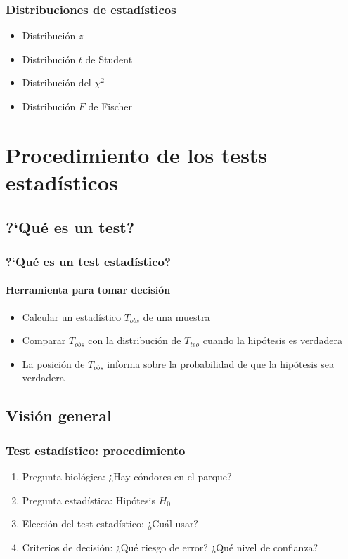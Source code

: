 \documentclass[mathserif]{beamer}
\begin{document}
\begin{frame}[label=otherdist2]
   \frametitle{Distribuciones de estad\'isticos}
   \begin{itemize}
      \item Distribuci\'on $z$ 
      \item Distribuci\'on $t$ de Student
      \item Distribuci\'on del $\chi^2$ 
      \item Distribuci\'on $F$ de Fischer
   \end{itemize}
\end{frame}%




\section[Procedimiento]{Procedimiento de los tests estad\'isticos}

\subsection[?`Qu\'e es un test?]{?`Qu\'e es un test?}

\begin{frame}[label=testdef]
   \frametitle{?`Qu\'e es un test estad\'istico?}
   \framesubtitle{Herramienta para tomar decisi\'on}
   \begin{itemize}
      \item Calcular un estad\'istico $T_{obs}$ de una muestra
      \item Comparar $T_{obs}$ con la distribuci\'on de $T_{teo}$ cuando la hip\'otesis es verdadera
      \item La posici\'on de $T_{obs}$ informa sobre la probabilidad de que la hip\'otesis sea verdadera
   \end{itemize}
\end{frame}%


\subsection[Generalidades]{Visi\'on general}

\begin{frame}[label=testproc1]
   \frametitle{Test estad\'istico: procedimiento}
   \begin{enumerate}[<+-| handout:1>]
      \item Pregunta biol\'ogica: ¿Hay c\'ondores en el parque?
      \item Pregunta estad\'istica: Hip\'otesis $H_0$
      \item Elecci\'on del test estad\'istico: ¿Cu\'al usar?
      \item Criterios de decisi\'on: ¿Qu\'e riesgo de error? ¿Qu\'e nivel de confianza?
   \end{enumerate}
\end{frame}%
\end{document}

